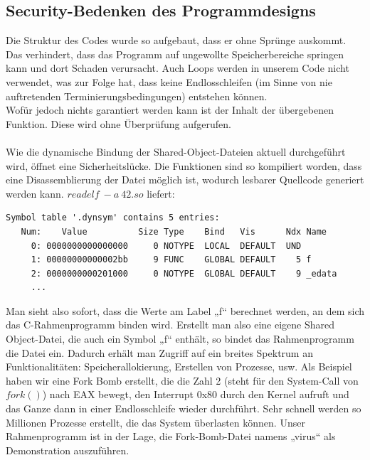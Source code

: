 \documentclass[course=erap]{aspdoc}
\begin{document}
\subsection{Security-Bedenken des Programmdesigns}
Die Struktur des Codes wurde so aufgebaut, dass er ohne Sprünge auskommt. Das verhindert, dass das Programm auf ungewollte Speicherbereiche springen kann und dort Schaden verursacht. Auch Loops werden in unserem Code nicht verwendet, was zur Folge hat, dass keine Endlosschleifen (im Sinne von nie auftretenden Terminierungsbedingungen) entstehen können.\\
Wofür jedoch nichts garantiert werden kann ist der Inhalt der übergebenen Funktion. Diese wird ohne Überprüfung aufgerufen.\\
\\
Wie die dynamische Bindung der Shared-Object-Dateien aktuell durchgeführt wird, öffnet eine Sicherheitslücke. Die Funktionen sind so kompiliert worden, dass eine Disassemblierung der Datei möglich ist, wodurch lesbarer Quellcode generiert werden kann.\newpage
$readelf\ -a\ 42.so$ liefert:
\begin{lstlisting}[frame=single]
Symbol table '.dynsym' contains 5 entries:
   Num:    Value          Size Type    Bind   Vis      Ndx Name
     0: 0000000000000000     0 NOTYPE  LOCAL  DEFAULT  UND
     1: 00000000000002bb     9 FUNC    GLOBAL DEFAULT    5 f
     2: 0000000000201000     0 NOTYPE  GLOBAL DEFAULT    9 _edata
     ...
     \end{lstlisting}
Man sieht also sofort, dass die Werte am Label „f“ berechnet werden, an dem sich das C-Rahmenprogramm binden wird. Erstellt man also eine eigene Shared Object-Datei, die auch ein Symbol „f“ enthält, so bindet das Rahmenprogramm die Datei ein. Dadurch erhält man Zugriff auf ein breites Spektrum an Funktionalitäten: Speicherallokierung, Erstellen von Prozesse, usw. Als Beispiel haben wir eine Fork Bomb erstellt, die die Zahl 2 (steht für den System-Call von $fork()$) nach EAX bewegt, den Interrupt 0x80 durch den Kernel aufruft und das Ganze dann in einer Endlosschleife wieder durchführt. Sehr schnell werden so Millionen Prozesse erstellt, die das System überlasten können. Unser Rahmenprogramm ist in der Lage, die Fork-Bomb-Datei namens „virus“ als Demonstration auszuführen.
\end{document}
